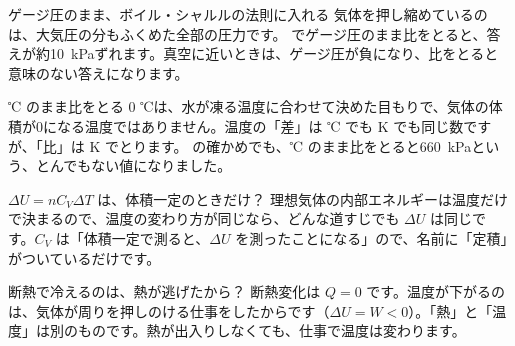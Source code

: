 \begin{tsumazuki}{ゲージ圧のまま、ボイル・シャルルの法則に入れる}
気体を押し縮めているのは、大気圧の分もふくめた全部の圧力です。 でゲージ圧のまま比をとると、答えが約\qty{10}{kPa}ずれます。真空に近いときは、ゲージ圧が負になり、比をとると意味のない答えになります。
\end{tsumazuki}
\begin{tsumazuki}{℃ のまま比をとる}
0 ℃は、水が凍る温度に合わせて決めた目もりで、気体の体積が0になる温度ではありません。温度の「差」は ℃ でも K でも同じ数ですが、「比」は K でとります。 の確かめでも、℃ のまま比をとると\qty{660}{kPa}という、とんでもない値になりました。
\end{tsumazuki}
\begin{tsumazuki}{$\Delta U=nC_V\Delta T$ は、体積一定のときだけ？}
理想気体の内部エネルギーは温度だけで決まるので、温度の変わり方が同じなら、どんな道すじでも $\Delta U$ は同じです。$C_V$ は「体積一定で測ると、$\Delta U$ を測ったことになる」ので、名前に「定積」がついているだけです。
\end{tsumazuki}
\begin{tsumazuki}{断熱で冷えるのは、熱が逃げたから？}
断熱変化は $Q=0$ です。温度が下がるのは、気体が周りを押しのける仕事をしたからです（$\Delta U=W<0$）。「熱」と「温度」は別のものです。熱が出入りしなくても、仕事で温度は変わります。
\end{tsumazuki}

